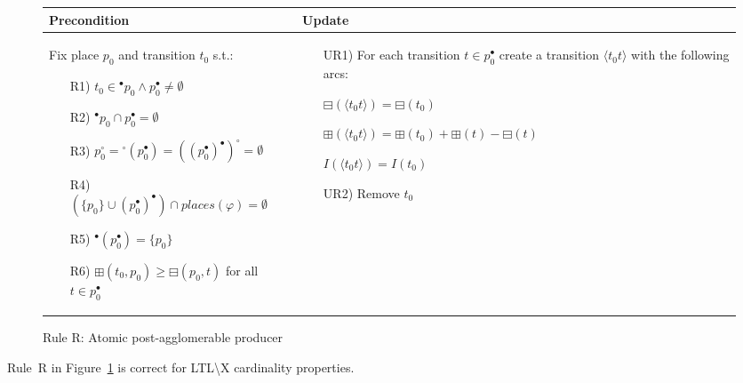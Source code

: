 \begin{figure}[h!]
    \begin{adjustbox}{center}
        \begin{tabular}{|p{68mm}|p{75mm}|} \hline
        Precondition & Update \\ \hline
        Fix place $p_0$ and transition $t_0$ s.t.:
        \begin{itemize}[leftmargin=10mm]
            \item[R1)] $t_0\in {}^\bullet p_0\land p_0^\bullet\neq\emptyset$
            \item[R2)] $^\bullet p_0 \cap p_0^\bullet = \emptyset$
            \item[R3)] $p_0 ^\circ = {}^\circ (p_0^\bullet) = ((p_0^\bullet)^\bullet)^\circ = \emptyset$
            \item[R4)] $(\{p_0\} \cup (p_0^\bullet)^\bullet) \cap places(\varphi) = \emptyset$
            \item[R5)] ${}^\bullet (p_0^\bullet)=\{p_0\}$
            \item[R6)] $\boxplus(t_0, p_0)\geq \boxminus(p_0,t)$ for all $t\in p_0^\bullet$
        \end{itemize} &

        \begin{itemize}[leftmargin=10mm]
            \item[UR1)]
            For each transition $t \in p_0^\bullet$ create a transition $\langle t_0 t\rangle$ with the following arcs:

            $\boxminus(\langle t_0 t\rangle)=\boxminus(t_0)$

            $\boxplus(\langle t_0 t\rangle)=\boxplus(t_0)+\boxplus(t)-\boxminus(t)$

            $I(\langle t_0 t\rangle)=I(t_0)$

            \item[UR2)] Remove $t_0$
        \end{itemize} \\ \hline
        \end{tabular}
    \end{adjustbox}
    \caption{Rule R: Atomic post-agglomerable producer}
    \label{fig:rule_r}
\end{figure}

\begin{theorem}
    Rule~R in Figure~\ref{fig:rule_r} is correct for LTL\textbackslash X cardinality properties.
\end{theorem}
